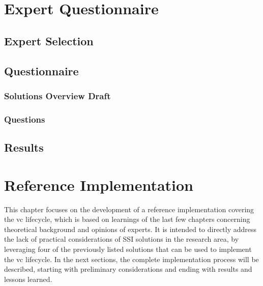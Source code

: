 
\chapter{Expert Questionnaire}\label{chapter: expert}

	\section{Expert Selection}
	
	\section{Questionnaire}
	\subsection{Solutions Overview Draft}
	\subsection{Questions}

	\section{Results}
	
	
\chapter{Reference Implementation}\label{chapter: implementation}

This chapter focuses on the development of a reference implementation covering the \ac{vc} lifecycle, which is based on learnings of the last few chapters concerning theoretical background and opinions of experts. It is intended to directly address the lack of practical considerations of \ac{SSI} solutions in the research area, by leveraging four of the previously listed solutions that can be used to implement the \ac{vc} lifecycle. In the next sections, the complete implementation process will be described, starting with preliminary considerations and ending with results and lessons learned.

